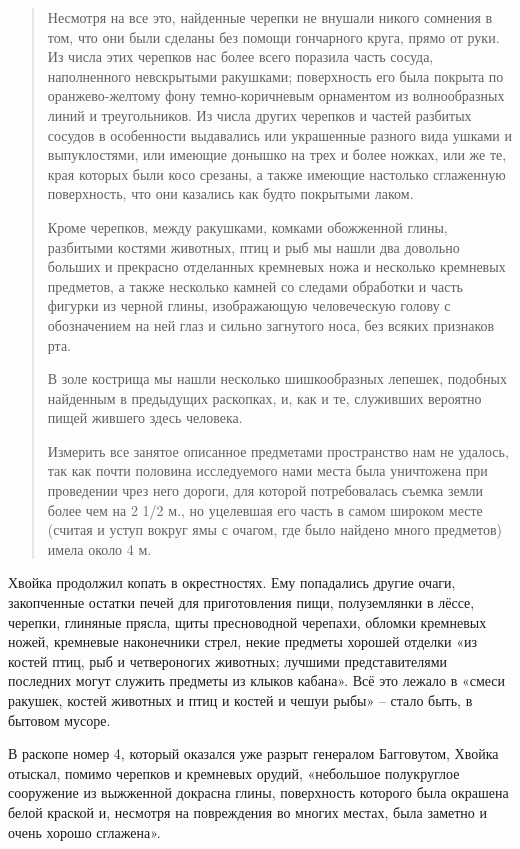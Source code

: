 \begin{quotation}
Несмотря на все это, найденные черепки не внушали никого сомнения в том, что они были сделаны без помощи гончарного круга, прямо от руки. Из числа этих черепков нас более всего поразила часть сосуда, наполненного невскрытыми ракушками; поверхность его была покрыта по оранжево-желтому фону темно-коричневым орнаментом из волнообразных линий и треугольников. Из числа других черепков и частей разбитых сосудов в особенности выдавались или украшенные разного вида ушками и выпуклостями, или имеющие донышко на трех и более ножках, или же те, края которых были косо срезаны, а также имеющие настолько сглаженную поверхность, что они казались как будто покрытыми лаком.

Кроме черепков, между ракушками, комками обожженной глины, разбитыми костями животных, птиц и рыб мы нашли два довольно больших и прекрасно отделанных кремневых ножа и несколько кремневых предметов, а также несколько камней со следами обработки и часть фигурки из черной глины, изображающую человеческую голову с обозначением на ней  глаз и сильно загнутого носа, без всяких признаков рта.

В золе кострища мы нашли несколько шишкообразных лепешек, подобных найденным в предыдущих раскопках, и, как и те, служивших вероятно пищей жившего здесь человека.

Измерить все занятое описанное предметами пространство нам не удалось, так как почти половина исследуемого нами места была уничтожена при проведении чрез него дороги, для которой потребовалась съемка земли более чем на 2 1/2 м., но уцелевшая его часть в самом широком месте (считая и уступ вокруг ямы с очагом, где было найдено много предметов) имела около 4 м.
\end{quotation}

Хвойка продолжил копать в окрестностях. Ему попадались другие очаги, закопченные остатки печей для приготовления пищи, полуземлянки в лёссе, черепки, глиняные прясла, щиты пресноводной черепахи, обломки кремневых ножей, кремневые наконечники стрел, некие предметы хорошей отделки «из костей птиц, рыб и четвероногих животных; лучшими представителями последних могут служить предметы из клыков кабана». Всё это лежало в «смеси ракушек, костей животных и птиц и костей и чешуи рыбы» – стало быть, в бытовом мусоре.

В раскопе номер 4, который оказался уже разрыт генералом Багговутом, Хвойка отыскал, помимо черепков и кремневых орудий, «небольшое полукруглое сооружение из выжженной докрасна глины, поверхность которого была окрашена белой краской и, несмотря на повреждения во многих местах, была заметно и очень хорошо сглажена».

